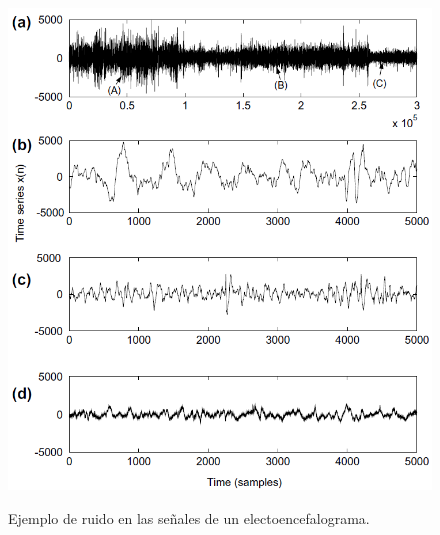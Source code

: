 \begin{figure}[h]
\vspace{0.1in}
\begin{center}
\includegraphics[scale=0.6]{brainsignal.png}\\
\end{center}
\caption{Ejemplo de ruido en las se\~nales de un electoencefalograma.}
\label{arm:fig6}
\end{figure}